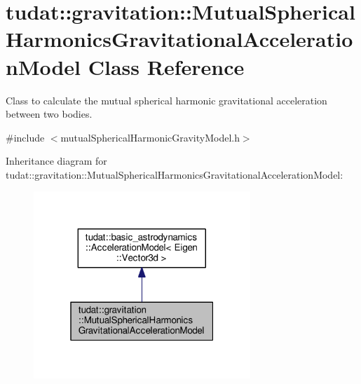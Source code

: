 \hypertarget{classtudat_1_1gravitation_1_1MutualSphericalHarmonicsGravitationalAccelerationModel}{}\section{tudat\+:\+:gravitation\+:\+:Mutual\+Spherical\+Harmonics\+Gravitational\+Acceleration\+Model Class Reference}
\label{classtudat_1_1gravitation_1_1MutualSphericalHarmonicsGravitationalAccelerationModel}


Class to calculate the mutual spherical harmonic gravitational acceleration between two bodies.  




{\ttfamily \#include $<$mutual\+Spherical\+Harmonic\+Gravity\+Model.\+h$>$}



Inheritance diagram for tudat\+:\+:gravitation\+:\+:Mutual\+Spherical\+Harmonics\+Gravitational\+Acceleration\+Model\+:
\nopagebreak
\begin{figure}[H]
\begin{center}
\leavevmode
\includegraphics[width=232pt]{classtudat_1_1gravitation_1_1MutualSphericalHarmonicsGravitationalAccelerationModel__inherit__graph}
\end{center}
\end{figure}


